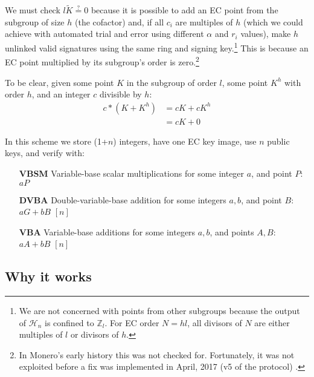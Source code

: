 We must check $l \tilde{K} \stackrel{?}{=} 0$ because it is possible to add an EC point from the subgroup of size $h$ (the cofactor) and, if all $c_i$ are multiples of $h$ (which we could achieve with automated trial and error using different $\alpha$ and $r_i$ values), make $h$ unlinked valid signatures using the same ring and signing key.\footnote{We are not concerned with points from other subgroups because the output of $\mathcal{H}_n$ is confined to $\mathbb{Z}_l$. For EC order $N = h l$, all divisors of $N$ are either multiples of $l$ or divisors of $h$.} This is because an EC point multiplied by its subgroup's order is zero.\footnote{In Monero's early history this was not checked for. Fortunately, it was not exploited before a fix was implemented in April, 2017 (v5 of the protocol) \cite{key-image-bug}.}

To be clear, given some point $K$ in the subgroup of order $l$, some point $K^h$ with order $h$, and an integer $c$ divisible by $h$:
\begin{align*}
    c*(K + K^h) &= cK + cK^h \\
                &= cK + 0
\end{align*}

In this scheme we store (1+$n$) integers, have one EC key image, use $n$ public keys, and verify with:

\begin{itemize}
    \setlength\itemsep{\listspace}
    \item [\textbf{VBSM}] Variable-base scalar multiplications for some integer $a$, and point $P$: $a P$ \quad [1]
    \item [\textbf{DVBA}] Double-variable-base addition for some integers $a, b$, and point $B$: $a G + b B$ \quad \([n]\)
    \item [\textbf{VBA}] Variable-base additions for some integers $a, b$, and points $A, B$: $a A + b B$ \quad \([n]\)
\end{itemize}



\subsection*{Why it works}

